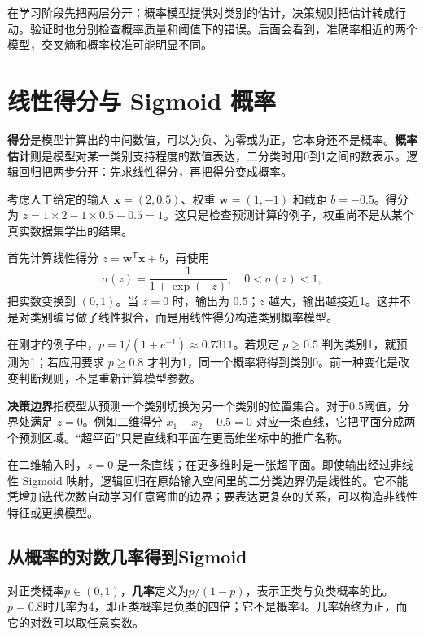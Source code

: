 在学习阶段先把两层分开：概率模型提供对类别的估计，决策规则把估计转成行动。验证时也分别检查概率质量和阈值下的错误。后面会看到，准确率相近的两个模型，交叉熵和概率校准可能明显不同。

\section{线性得分与 Sigmoid 概率}

\textbf{得分}是模型计算出的中间数值，可以为负、为零或为正，它本身还不是概率。\textbf{概率估计}则是模型对某一类别支持程度的数值表达，二分类时用0到1之间的数表示。逻辑回归把两步分开：先求线性得分，再把得分变成概率。

考虑人工给定的输入 $\mathbf x=(2,0.5)$、权重 $\mathbf w=(1,-1)$ 和截距 $b=-0.5$。得分为 $z=1\times2-1\times0.5-0.5=1$。这只是检查预测计算的例子，权重尚不是从某个真实数据集学出的结果。

首先计算线性得分 $z=\mathbf w^{\mathsf T}\mathbf x+b$，再使用
\begin{equation}
\sigma(z)=\frac{1}{1+\exp(-z)},\quad 0<\sigma(z)<1,
\end{equation}
把实数变换到 $(0,1)$。当 $z=0$ 时，输出为 $0.5$；$z$ 越大，输出越接近1。这并不是对类别编号做了线性拟合，而是用线性得分构造类别概率模型。

在刚才的例子中，$p=1/(1+e^{-1})\approx0.7311$。若规定 $p\geq0.5$ 判为类别1，就预测为1；若应用要求 $p\geq0.8$ 才判为1，同一个概率将得到类别0。前一种变化是改变判断规则，不是重新计算模型参数。

\textbf{决策边界}指模型从预测一个类别切换为另一个类别的位置集合。对于0.5阈值，分界处满足 $z=0$。例如二维得分 $x_1-x_2-0.5=0$ 对应一条直线，它把平面分成两个预测区域。“超平面”只是直线和平面在更高维坐标中的推广名称。



在二维输入时，$z=0$ 是一条直线；在更多维时是一张超平面。即使输出经过非线性 Sigmoid 映射，逻辑回归在原始输入空间里的二分类边界仍是线性的。它不能凭增加迭代次数自动学习任意弯曲的边界；要表达更复杂的关系，可以构造非线性特征或更换模型。

\subsection{从概率的对数几率得到Sigmoid}
对正类概率$p\in(0,1)$，\textbf{几率}定义为$p/(1-p)$，表示正类与负类概率的比。$p=0.8$时几率为4，即正类概率是负类的四倍；它不是概率4。几率始终为正，而它的对数可以取任意实数。

